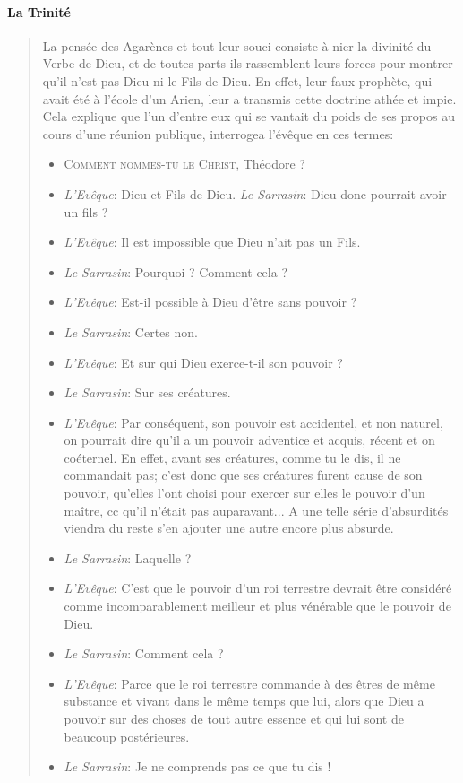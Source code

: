 \paragraph{La Trinité}
\begin{quote}
La pensée des Agarènes et tout leur souci consiste à nier la divinité du Verbe de Dieu, et de toutes parts ils rassemblent leurs forces pour montrer qu'il n'est pas Dieu ni le Fils de Dieu. En effet, leur faux prophète, qui avait été à l'école d'un Arien, leur a transmis cette doctrine athée et impie. Cela explique que l'un d'entre eux qui se vantait du poids de ses propos au cours d'une réunion publique, interrogea l'évêque en ces termes: 

\begin{itemize}
\item \textsc{Comment nommes-tu le Christ,} Théodore ? 
    \item \textit{L'Evêque}: Dieu et Fils de Dieu.
\textit{Le Sarrasin}: Dieu donc pourrait avoir un fils ?
\item \textit{L'Evêque}: Il est impossible que Dieu n'ait pas un Fils.
\item \textit{Le Sarrasin}: Pourquoi ? Comment cela ?
\item \textit{L'Evêque}: Est-il possible à Dieu d'être sans pouvoir ?
\item \textit{Le Sarrasin}: Certes non.
\item \textit{L'Evêque}: Et sur qui Dieu exerce-t-il son pouvoir ?
\item \textit{Le Sarrasin}: Sur ses créatures.
\item \textit{L'Evêque}: Par conséquent, son pouvoir est accidentel, et non naturel, on pourrait dire qu'il a un pouvoir adventice et acquis, récent et on coéternel. En effet, avant ses créatures, comme tu le dis, il ne commandait pas; c'est donc que ses créatures furent cause de son pouvoir, qu'elles l'ont choisi pour exercer sur elles le pouvoir d'un 
maître, cc qu'il n'était pas auparavant... A une telle série d'absurdités viendra du reste s'en ajouter une autre encore plus absurde.
\item \textit{Le Sarrasin}: Laquelle ?
\item \textit{L'Evêque}: C'est que le pouvoir d'un roi terrestre devrait être considéré comme incomparablement meilleur et plus vénérable que le pouvoir de Dieu.
\item \textit{Le Sarrasin}: Comment cela ?
\item \textit{\textit{L'Evêque}}: Parce que le roi terrestre commande à des êtres de même substance et vivant dans le même temps que lui, alors que Dieu a pouvoir sur des choses de tout autre essence et qui lui sont de beaucoup postérieures.
\item \textit{Le Sarrasin}: Je ne comprends pas ce que tu dis !

\end{itemize}
\end{quote}


